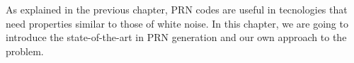 As explained in the previous chapter, PRN codes are useful in tecnologies
that need properties similar to those of white noise. In this chapter, we
are going to introduce the state-of-the-art in PRN generation and our own
approach to the problem.


